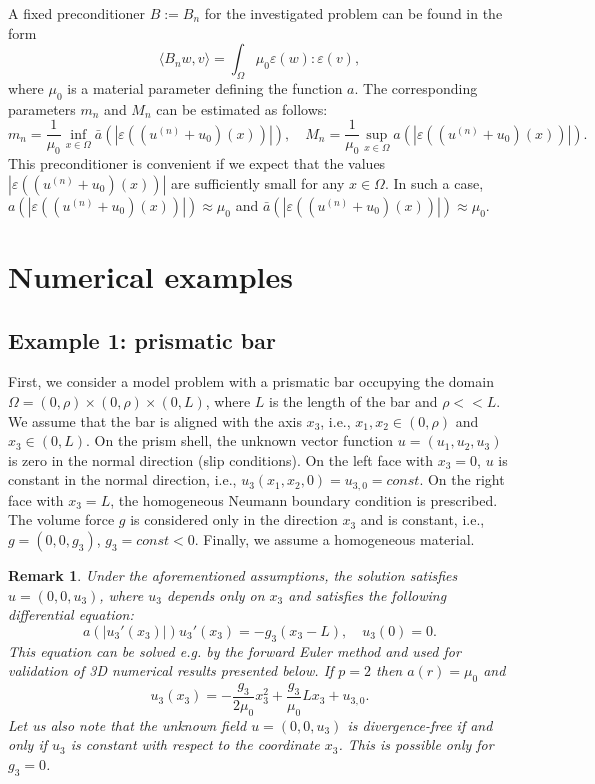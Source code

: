 \documentclass[12pt]{article}
\newtheorem{remark}{Remark}[section]
\numberwithin{equation}{section}
\begin{document}
A fixed preconditioner $B:=B_n$ for the investigated problem can be found in the form
\begin{equation}
	\langle B_n w,v\rangle=\int_{\Omega}\mu_0\varepsilon(w):\varepsilon(v),
	\label{B_n2}
\end{equation}
where $\mu_0$ is a material parameter defining the function $a$. The corresponding parameters $m_n$ and $M_n$ can be estimated as follows:
\begin{equation}
	m_n=\frac{1}{\mu_0}\inf_{x\in\Omega}\bar a(|\varepsilon((u^{(n)}+u_0)(x))|),\quad M_n=\frac{1}{\mu_0}\sup_{x\in\Omega}a(|\varepsilon((u^{(n)}+u_0)(x))|).
	\label{Mm2}
\end{equation}
This preconditioner is convenient if we expect that the values $|\varepsilon((u^{(n)}+u_0)(x))|$ are sufficiently small for any $x\in\Omega$. In such a case, $a(|\varepsilon((u^{(n)}+u_0)(x))|)\approx\mu_0$ and $\bar a(|\varepsilon((u^{(n)}+u_0)(x))|)\approx\mu_0$.

\section{Numerical examples}

\subsection{Example 1: prismatic bar}
\label{subsec_ex1}

First, we consider a model problem with a prismatic bar occupying the domain $\Omega=(0,\rho)\times(0,\rho)\times(0,L)$, where $L$ is the length of the bar and $\rho<<L$. We assume that the bar is aligned with the axis $x_3$, i.e., $x_1,x_2\in(0,\rho)$ and $x_3\in(0,L)$. On the prism shell, the unknown vector function $u=(u_1,u_2,u_3)$ is zero in the normal direction \alert{(slip conditions)}. On the left face with $x_3=0$, $u$ is constant in the normal direction, i.e., $u_3(x_1,x_2,0)=u_{3,0}=const$. On the right face with $x_3=L$, the homogeneous Neumann boundary condition is prescribed.  The volume force $g$ is considered only in the direction $x_3$ and is constant, i.e., $g=(0,0,g_3)$, $g_3=const<0$. Finally, we assume a homogeneous material. 

\begin{remark}
Under the aforementioned assumptions, the solution satisfies $u=(0,0,u_3)$, where $u_3$ depends only on $x_3$ and satisfies the following differential equation:
$$a(|u_3'(x_3)|)u_3'(x_3)=-g_3(x_3-L),\quad u_3(0)=0.$$ 
This equation can be solved e.g. by the forward Euler method and used for validation of 3D numerical results presented below. If $p=2$ then $a(r)=\mu_0$ and
$$u_3(x_3)=-\frac{g_3}{2\mu_0}x_3^2+\frac{g_3}{\mu_0}Lx_3+u_{3,0}.$$
\alert{Let us also note that the unknown field $u=(0,0,u_3)$ is divergence-free if and only if $u_3$ is constant with respect to the coordinate $x_3$. This is possible only for $g_3=0$.}
\end{remark}
\end{document}
